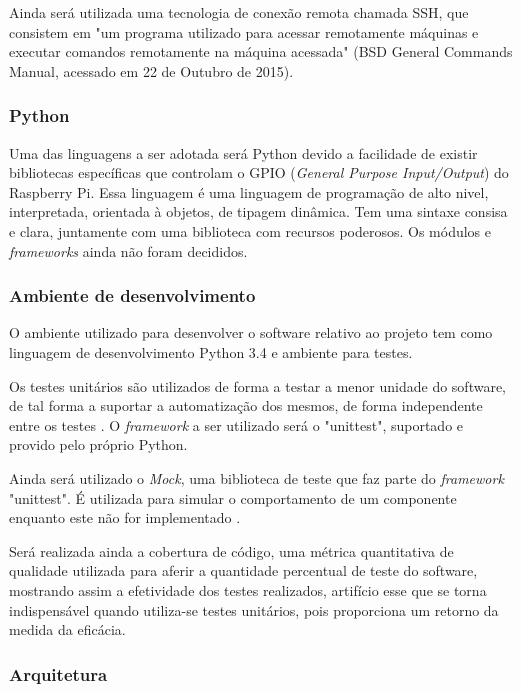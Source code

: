 Ainda será utilizada uma tecnologia de conexão remota chamada SSH, que consistem em "um programa utilizado para acessar remotamente máquinas e executar comandos remotamente na máquina acessada" (BSD General Commands Manual, acessado em 22 de Outubro de 2015).

\subsubsection{Python}

Uma das linguagens a ser adotada será Python devido a facilidade de existir bibliotecas específicas que controlam o GPIO (\textit{General Purpose Input/Output}) do Raspberry Pi. Essa linguagem é uma linguagem de programação de alto nivel, interpretada, orientada à objetos, de tipagem dinâmica. Tem uma sintaxe consisa e clara, juntamente com uma biblioteca com recursos poderosos. Os módulos e \textit{frameworks} ainda não foram decididos.

\subsubsection{Ambiente de desenvolvimento}

O ambiente utilizado para desenvolver o software relativo ao projeto tem como linguagem de desenvolvimento Python 3.4 e ambiente para testes.

Os testes unitários são utilizados de forma a testar a menor unidade do software, de tal forma a suportar a automatização dos mesmos, de forma independente entre os testes \cite{unittest}. O \textit{framework} a ser utilizado será o "unittest", suportado e provido pelo próprio Python.

Ainda será utilizado o \textit{Mock}, uma biblioteca de teste que faz parte do \textit{framework} "unittest". É utilizada para simular o comportamento de um componente enquanto este não for implementado \cite{unittest_mock}.

Será realizada ainda a cobertura de código, uma métrica quantitativa de qualidade utilizada para aferir a quantidade percentual de teste do software, mostrando assim a efetividade dos testes realizados, artifício esse que se torna indispensável quando utiliza-se testes unitários, pois proporciona um retorno da medida da eficácia.

\subsubsection{Arquitetura}

